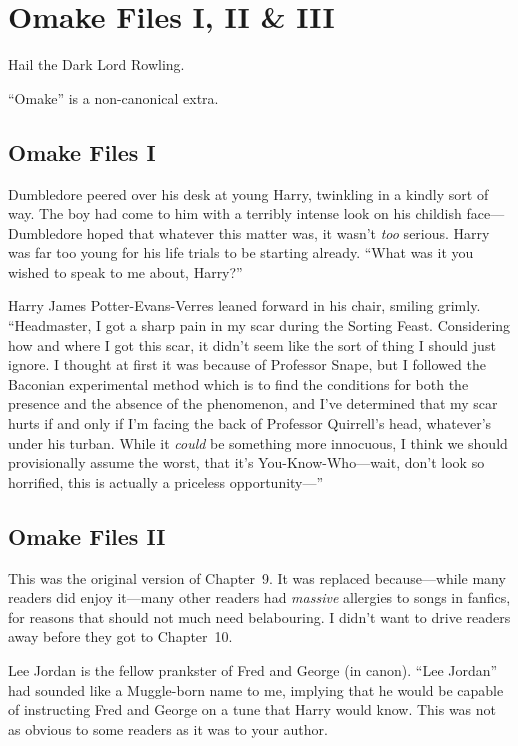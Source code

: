 \chapter{Omake Files I, II \& III}

\begin{chapterOpeningAuthorNote}
Hail the Dark Lord Rowling.

“Omake” is a non-canonical extra.
\end{chapterOpeningAuthorNote}

\section{Omake Files I}

Dumbledore peered over his desk at young Harry, twinkling in a kindly sort of way. The boy had come to him with a terribly intense look on his childish face—Dumbledore hoped that whatever this matter was, it wasn’t \emph{too} serious. Harry was far too young for his life trials to be starting already. “What was it you wished to speak to me about, Harry?”

Harry James Potter-Evans-Verres leaned forward in his chair, smiling grimly. “Headmaster, I got a sharp pain in my scar during the Sorting Feast. Considering how and where I got this scar, it didn’t seem like the sort of thing I should just ignore. I thought at first it was because of Professor Snape, but I followed the Baconian experimental method which is to find the conditions for both the presence and the absence of the phenomenon, and I’ve determined that my scar hurts if and only if I’m facing the back of Professor Quirrell’s head, whatever’s under his turban. While it \emph{could} be something more innocuous, I think we should provisionally assume the worst, that it’s You-Know-Who—wait, don’t look so horrified, this is actually a priceless opportunity—”

\section{Omake Files II}

This was the original version of Chapter~9. It was replaced because—while many readers did enjoy it—many other readers had \emph{massive} allergies to songs in fanfics, for reasons that should not much need belabouring. I didn’t want to drive readers away before they got to Chapter~10.

Lee Jordan is the fellow prankster of Fred and George (in canon). “Lee Jordan” had sounded like a Muggle-born name to me, implying that he would be capable of instructing Fred and George on a tune that Harry would know. This was not as obvious to some readers as it was to your author.

